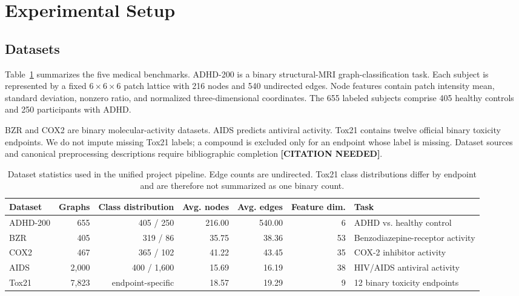 \documentclass[10pt,twocolumn]{article}
\newcommand{\citeneeded}{\textbf{[CITATION NEEDED]}}
\begin{document}
\section{Experimental Setup}

\subsection{Datasets}

Table~\ref{tab:datasets} summarizes the five medical benchmarks. ADHD-200 is a binary structural-MRI graph-classification task. Each subject is represented by a fixed $6\times6\times6$ patch lattice with 216 nodes and 540 undirected edges. Node features contain patch intensity mean, standard deviation, nonzero ratio, and normalized three-dimensional coordinates. The 655 labeled subjects comprise 405 healthy controls and 250 participants with ADHD.

BZR and COX2 are binary molecular-activity datasets. AIDS predicts antiviral activity. Tox21 contains twelve official binary toxicity endpoints. We do not impute missing Tox21 labels; a compound is excluded only for an endpoint whose label is missing. Dataset sources and canonical preprocessing descriptions require bibliographic completion \citeneeded.

\begin{table}[t]
\centering
\caption{Dataset statistics used in the unified project pipeline. Edge counts are undirected. Tox21 class distributions differ by endpoint and are therefore not summarized as one binary count.}
\label{tab:datasets}
\small
\begin{tabular}{lrrrrrl}
\toprule
Dataset & Graphs & Class distribution & Avg. nodes & Avg. edges & Feature dim. & Task \\
\midrule
ADHD-200 & 655 & 405 / 250 & 216.00 & 540.00 & 6 & ADHD vs. healthy control \\
BZR      & 405 & 319 / 86  & 35.75 & 38.36 & 53 & Benzodiazepine-receptor activity \\
COX2     & 467 & 365 / 102 & 41.22 & 43.45 & 35 & COX-2 inhibitor activity \\
AIDS     & 2,000 & 400 / 1,600 & 15.69 & 16.19 & 38 & HIV/AIDS antiviral activity \\
Tox21    & 7,823 & endpoint-specific & 18.57 & 19.29 & 9 & 12 binary toxicity endpoints \\
\bottomrule
\end{tabular}
\end{table}
\end{document}
